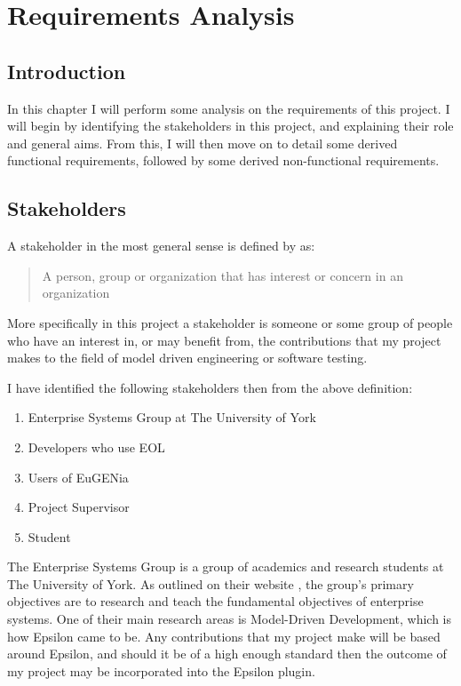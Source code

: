 \chapter{Requirements Analysis}

\section{Introduction}

In this chapter I will perform some analysis on the requirements of this project. I will begin by identifying the stakeholders in this project, and explaining their role and general aims. From this, I will then move on to detail some derived functional requirements, followed by some derived non-functional requirements.

\section{Stakeholders}
A stakeholder in the most general sense is defined by \citet{stakeholderDef} as:

\begin{quote}
	A person, group or organization that has interest or concern in an organization
\end{quote}

More specifically in this project a stakeholder is someone or some group of people who have an interest in, or may benefit from, the contributions that my project makes to the field of model driven engineering or software testing.

I have identified the following stakeholders then from the above definition:

\begin{enumerate}
\item Enterprise Systems Group at The University of York
\item Developers who use EOL
\item Users of EuGENia
\item Project Supervisor
\item Student
\end{enumerate}

The Enterprise Systems Group is a group of academics and research students at The University of York. As outlined on their website \cite{ESG}, the group's primary objectives are to research and teach the fundamental objectives of enterprise systems. One of their main research areas is Model-Driven Development, which is how Epsilon came to be. Any contributions that my project make will be based around Epsilon, and should it be of a high enough standard then the outcome of my project may be incorporated into the Epsilon plugin.

